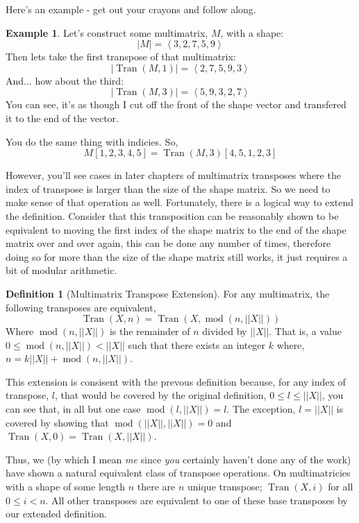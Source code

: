 \documentclass[12pt]{book}
\theoremstyle{plain}
\theoremstyle{definition}
\newtheorem{definition}{Definition}[chapter]
\newtheorem{example}{Example}[chapter]
\theoremstyle{ppart}
\theoremstyle{case}
\theoremstyle{solution}
\DeclareMathOperator{\Tran}{Tran}
\DeclareMathOperator{\remainder}{mod}
\begin{document}
Here's an example - get out your crayons and follow along.

\begin{example}
Let's construct some multimatrix, $M$, with a shape:
\[ |M| = \left<3,2,7,5,9\right> \]
Then lets take the first transpose of that
multimatrix:
\[ |\Tran(M, 1)| = \left<2,7,5,9,3\right> \]
And... how about the third:
\[ |\Tran(M, 3)| = \left<5,9,3,2,7\right> \]
You can see, it's as though I cut off the front of the shape vector and transfered
it to the end of the vector.

You do the same thing with indicies. So,
\[ M[1,2,3,4,5] = \Tran(M, 3)[4,5,1,2,3] \]
\end{example}

However, you'll see cases in later chapters of multimatrix transposes where
the index of transpose is larger than the size of the shape matrix. So we need
to make sense of that operation as well. Fortunately, there is a logical way
to extend the definition. Consider that this transposition can be reasonably
shown to be equivalent to moving the first index of the shape matrix
to the end of the shape matrix over and over again, this can be done any number
of times, therefore doing so for more than the size of the shape matrix still works,
it just requires a bit of modular arithmetic.

\begin{definition}[Multimatrix Transpose Extension]
\label{tran_ext}
For any multimatrix, the following transposes are equivalent,
\[ \Tran(X, n) = \Tran(X, \remainder(n, ||X||)) \]
Where $\remainder(n, ||X||)$ is the remainder of $n$ divided by $||X||$.
That is, a value $0 \le \remainder(n, ||X||) < ||X||$ such that there exists an
integer $k$ where, $n = k||X|| + \remainder(n, ||X||)$.
\end{definition}

This extension is consisent with the prevous definition because, for any
index of transpose, $l$, that would be covered by the original definition,
$0 \le l \le ||X||$, you can see that, in all but one case $\remainder(l, ||X||) = l$.
The exception, $l = ||X||$ is covered by showing that
$\remainder(||X||, ||X||) = 0$ and $\Tran(X, 0) = \Tran(X, ||X||)$. 

Thus, we (by which I mean \textit{me} since \textit{you} certainly haven't done any
of the work) have shown a natural equivalent class \cite{book:abstract} of transpose
operations. On multimatricies with a shape of some length $n$ there are $n$ unique
transpose; $\Tran(X, i)$ for all $0 \le i < n$. All other transposes are equivalent
to one of these base transposes by our extended definition.
\end{document}
